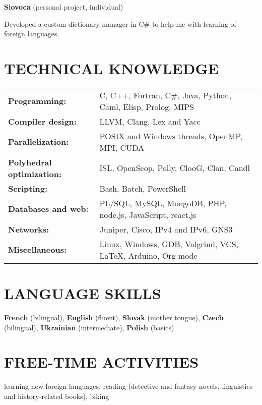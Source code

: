 \documentclass[a4paper, 11pt]{article}
\begin{document}
\vspace{.7em}

\textbf{Slovoca} (personal project, individual)

Developed a custom dictionary manager in C\# to help me with learning of foreign
languages.

\section*{TECHNICAL KNOWLEDGE}

\begin{tabularx}{\linewidth}{lX}
  \textbf{Programming:} & C, C++, Fortran, C\#, Java, Python, Caml, Elisp,
  Prolog, MIPS \\
  \textbf{Compiler design:} & LLVM, Clang, Lex and Yacc \\
  \textbf{Parallelization:} & POSIX and Windows threads, OpenMP, MPI, CUDA \\
  \textbf{Polyhedral optimization:} & ISL, OpenScop, Polly, ClooG, Clan,
  Candl \\
  \textbf{Scripting:} & Bash, Batch, PowerShell \\
  \textbf{Databases and web:} &  PL/SQL, MySQL, MongoDB, PHP, node.js,
  JavaScript, react.js \\
  \textbf{Networks:} & Juniper, Cisco, IPv4 and IPv6, GNS3 \\
  \textbf{Miscellaneous:} & Linux, Windows, GDB, Valgrind, VCS, \LaTeX, Arduino,
  Org mode \\
\end{tabularx}

\section*{LANGUAGE SKILLS}

\textbf{French} (bilingual), \textbf{English} (fluent), \textbf{Slovak} (mother
tongue), \textbf{Czech} (bilingual), \textbf{Ukra\-ini\-an} (intermediate),
\textbf{Polish} (basics)

\section*{FREE-TIME ACTIVITIES}

learning new foreign languages, reading (detective and fantasy novels,
linguistics and history-related books), biking
\end{document}
